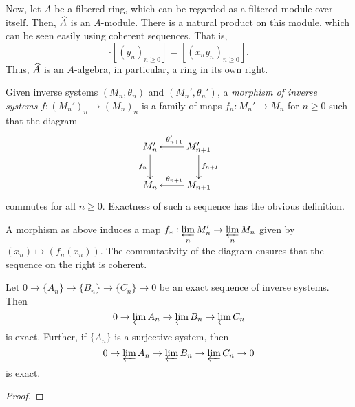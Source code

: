 Now, let $A$ be a filtered ring, which can be regarded as a filtered module over itself. Then, $\widehat{A}$ is an $A$-module. There is a natural product on this module, which can be seen easily using coherent sequences. That is, 
\begin{equation*}
    [(x_n)_{n\ge 0}]\cdot[(y_n)_{n\ge 0}] = [(x_ny_n)_{n\ge 0}].
\end{equation*}
Thus, $\widehat{A}$ is an $A$-algebra, in particular, a ring in its own right.

\begin{definition}
    Given inverse systems $(M_n,\theta_n)$ and $(M_n',\theta_n')$, a \emph{morphism of inverse systems} $f: (M_n')_n\to (M_n)_n$ is a family of maps $f_n: M_n'\to M_n$ for $n\ge 0$ such that the diagram 
    \begin{equation*}
        \xymatrix {
            M_n'\ar[d]_{f_n} & M_{n + 1}'\ar[d]^{f_{n + 1}}\ar[l]_{\theta_{n + 1}'}\\
            M_n & M_{n + 1}\ar[l]_{\theta_{n + 1}}
        }
    \end{equation*}
    commutes for all $n\ge 0$. Exactness of such a sequence has the obvious definition.
\end{definition}

A morphism as above induces a map $\displaystyle f_\ast: \varprojlim_n M_n'\to\varprojlim_n M_n$ given by $(x_n)\mapsto (f_n(x_n))$. The commutativity of the diagram ensures that the sequence on the right is coherent.

\begin{proposition}
    Let $0\to\{A_n\}\to\{B_n\}\to\{C_n\}\to0$ be an exact sequence of inverse systems. Then 
    \begin{equation*}
        0\to\varprojlim A_n\to\varprojlim B_n\to\varprojlim C_n
    \end{equation*}
    is exact. Further, if $\{A_n\}$ is a surjective system, then 
    \begin{equation*}
        0\to\varprojlim A_n\to\varprojlim B_n\to\varprojlim C_n\to 0
    \end{equation*}
    is exact.
\end{proposition}
\begin{proof}
\end{proof}